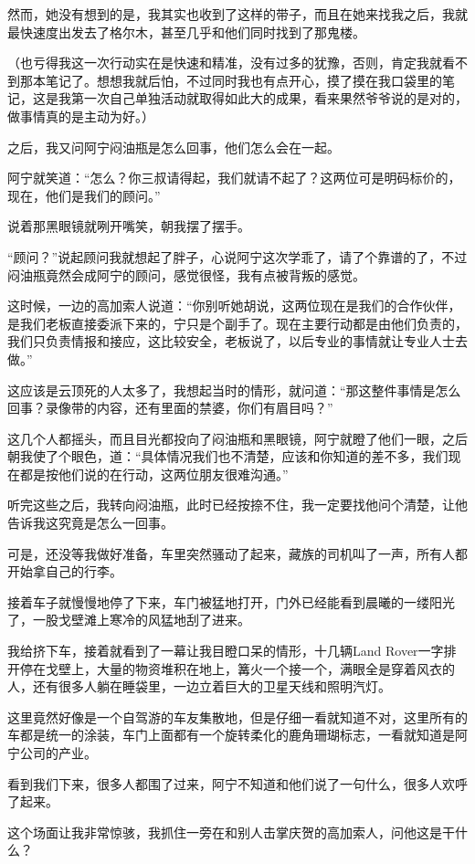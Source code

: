 然而，她没有想到的是，我其实也收到了这样的带子，而且在她来找我之后，我就最快速度出发去了格尔木，甚至几乎和他们同时找到了那鬼楼。

（也亏得我这一次行动实在是快速和精准，没有过多的犹豫，否则，肯定我就看不到那本笔记了。想想我就后怕，不过同时我也有点开心，摸了摸在我口袋里的笔记，这是我第一次自己单独活动就取得如此大的成果，看来果然爷爷说的是对的，做事情真的是主动为好。）

之后，我又问阿宁闷油瓶是怎么回事，他们怎么会在一起。

阿宁就笑道：“怎么？你三叔请得起，我们就请不起了？这两位可是明码标价的，现在，他们是我们的顾问。”

说着那黑眼镜就咧开嘴笑，朝我摆了摆手。

“顾问？”说起顾问我就想起了胖子，心说阿宁这次学乖了，请了个靠谱的了，不过闷油瓶竟然会成阿宁的顾问，感觉很怪，我有点被背叛的感觉。

这时候，一边的高加索人说道：“你别听她胡说，这两位现在是我们的合作伙伴，是我们老板直接委派下来的，宁只是个副手了。现在主要行动都是由他们负责的，我们只负责情报和接应，这比较安全，老板说了，以后专业的事情就让专业人士去做。”

这应该是云顶死的人太多了，我想起当时的情形，就问道：“那这整件事情是怎么回事？录像带的内容，还有里面的禁婆，你们有眉目吗？”

这几个人都摇头，而且目光都投向了闷油瓶和黑眼镜，阿宁就瞪了他们一眼，之后朝我使了个眼色，道：“具体情况我们也不清楚，应该和你知道的差不多，我们现在都是按他们说的在行动，这两位朋友很难沟通。”

听完这些之后，我转向闷油瓶，此时已经按捺不住，我一定要找他问个清楚，让他告诉我这究竟是怎么一回事。

可是，还没等我做好准备，车里突然骚动了起来，藏族的司机叫了一声，所有人都开始拿自己的行李。

接着车子就慢慢地停了下来，车门被猛地打开，门外已经能看到晨曦的一缕阳光了，一股戈壁滩上寒冷的风猛地刮了进来。

我给挤下车，接着就看到了一幕让我目瞪口呆的情形，十几辆Land Rover一字排开停在戈壁上，大量的物资堆积在地上，篝火一个接一个，满眼全是穿着风衣的人，还有很多人躺在睡袋里，一边立着巨大的卫星天线和照明汽灯。

这里竟然好像是一个自驾游的车友集散地，但是仔细一看就知道不对，这里所有的车都是统一的涂装，车门上面都有一个旋转柔化的鹿角珊瑚标志，一看就知道是阿宁公司的产业。

看到我们下来，很多人都围了过来，阿宁不知道和他们说了一句什么，很多人欢呼了起来。

这个场面让我非常惊骇，我抓住一旁在和别人击掌庆贺的高加索人，问他这是干什么？


